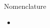 \newpage
~\\
\vspace{50pt}
\begin{center}
{\Large \sc Nomenclature \\ \rm}
\vspace{25pt}
\end{center}
\begin{itemize}
    \item 
\end{itemize}

